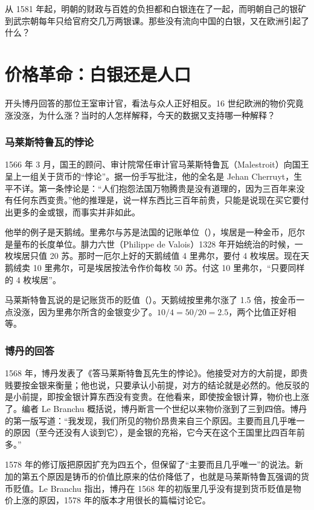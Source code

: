 从 1581 年起，明朝的财政与百姓的负担都和白银连在了一起，而明朝自己的银矿到武宗朝每年只给官府交几万两银课。那些没有流向中国的白银，又在欧洲引起了什么？

\section{价格革命：白银还是人口}\label{sec:silver-revolution}

开头博丹回答的那位王室审计官，看法与众人正好相反。16 世纪欧洲的物价究竟涨没涨，为什么涨？当时的人怎样解释，今天的数据又支持哪一种解释？

\subsubsection{马莱斯特鲁瓦的悖论}
1566 年 3 月，国王的顾问、审计院常任审计官马莱斯特鲁瓦（Malestroit）向国王呈上一组关于货币的“悖论”。据一份手写批注，他的全名是 Jehan Cherruyt，生平不详\cite{lebranchu1934}。第一条悖论是：“人们抱怨法国万物腾贵是没有道理的，因为三百年来没有任何东西变贵。”\cite{bodin1578}他的推理是，说一样东西比三百年前贵，只能是说现在买它要付出更多的金或银，而事实并非如此\cite{lebranchu1934}。

他举的例子是天鹅绒。里弗尔与苏是法国的记账单位（），埃居是一种金币，厄尔是量布的长度单位。腓力六世（Philippe de Valois）1328 年开始统治的时候，一枚埃居只值 20 苏。那时一厄尔上好的天鹅绒值 4 里弗尔，要付 4 枚埃居。现在天鹅绒卖 10 里弗尔，可是埃居按法令作价每枚 50 苏。付这 10 里弗尔，“只要同样的 4 枚埃居”\cite{lebranchu1934}。

马莱斯特鲁瓦说的是记账货币的贬值（）。天鹅绒按里弗尔涨了 1.5 倍，按金币一点没涨，因为里弗尔所含的金银变少了。$10/4=50/20=2.5$，两个比值正好相等。

\subsubsection{博丹的回答}
1568 年，博丹发表了《答马莱斯特鲁瓦先生的悖论》。他接受对方的大前提，即贵贱要按金银来衡量；他也说，只要承认小前提，对方的结论就是必然的\cite{lebranchu1934}。他反驳的是小前提，即按金银计算东西没有变贵。在他看来，即使按金银计算，物价也上涨了。编者 Le Branchu 概括说，博丹断言一个世纪以来物价涨到了三到四倍\cite{lebranchu1934}。博丹的第一版写道：“我发现，我们所见的物价昂贵来自三个原因。主要而且几乎唯一的原因（至今还没有人谈到它），是金银的充裕，它今天在这个王国里比四百年前多。”\cite{lebranchu1934}

1578 年的修订版把原因扩充为四五个，但保留了“主要而且几乎唯一”的说法\cite{bodin1578}。新加的第五个原因是铸币的价值比原来的估价降低了\cite{lebranchu1934}，也就是马莱斯特鲁瓦强调的货币贬值。Le Branchu 指出，博丹在 1568 年的初版里几乎没有提到货币贬值是物价上涨的原因，1578 年的版本才用很长的篇幅讨论它\cite{lebranchu1934}。


